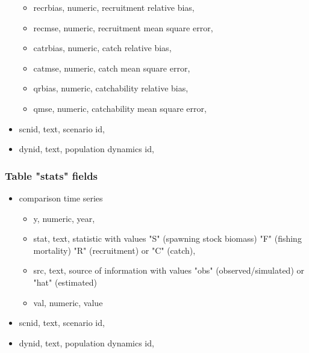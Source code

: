 \documentclass[a4paper]{article}\usepackage{graphicx, color}
\begin{document}
\begin{itemize}
\begin{itemize}
		\item recrbias, numeric, recruitment relative bias,
		\item recmse, numeric, recruitment mean square error,
		\item catrbias, numeric, catch relative bias,
		\item catmse, numeric, catch mean square error,
		\item qrbias, numeric, catchability relative bias,
		\item qmse, numeric, catchability mean square error,
	\end{itemize}
		\item scnid, text, scenario id, 
		\item dynid, text, population dynamics id, 
\end{itemize}


\subsubsection{Table "stats" fields}

\begin{itemize}
	\item comparison time series
	\begin{itemize}
		\item y, numeric, year,
		\item stat, text, statistic with values "S" (spawning stock biomass) "F" (fishing mortality) "R" (recruitment) or "C" (catch),
		\item src, text, source of information with values "obs" (observed/simulated) or "hat" (estimated)
		\item val, numeric, value
	\end{itemize}
	\item scnid, text, scenario id, 
	\item dynid, text, population dynamics id, 
\end{itemize}


\end{document}
